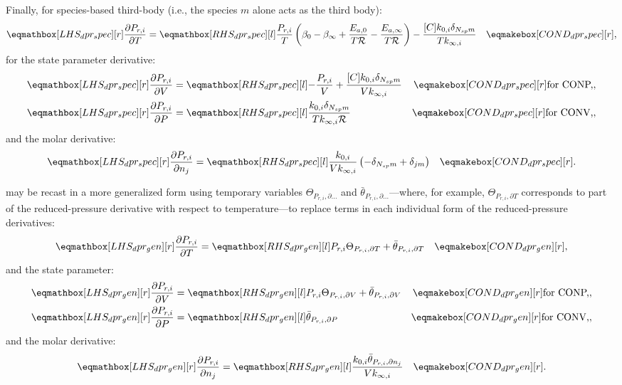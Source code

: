 \documentclass[12pt,number,sort&compress]{elsarticle}
\begin{document}
Finally, for species-based third-body (i.e., the species $m$ alone acts as the third body):
\begin{align}
 \lhs{dpr_spec}{\frac{\partial P_{r, i} }{\partial T }} &=\rhs{dpr_spec}{\frac{P_{r, i}}{T} \left(\beta_{0} - \beta_{\infty} + \frac{E_{a, 0}}{T \Ru/} - \frac{E_{a, \infty}}{T \Ru/}\right) - \frac{[C] k_{0, i} \delta_{\ns/ m}}{T k_{\infty, i}}} & \cond{dpr_spec}{,} \label{e:dpr_spec_dt}
\end{align}
for the state parameter derivative:
\begin{subequations}
 \label{e:dpr_spec_de}
 \begin{align}
  \lhs{dpr_spec}{\frac{\partial P_{r, i} }{\partial V }} &= \rhs{dpr_spec}{- \frac{P_{r, i}}{V} + \frac{[C] k_{0, i} \delta_{\ns/ m}}{V k_{\infty, i}}} & \cond{dpr_spec}{\dconp/,}\\
  \lhs{dpr_spec}{\frac{\partial P_{r, i} }{\partial P }} &= \rhs{dpr_spec}{\frac{k_{0, i} \delta_{\ns/ m}}{T k_{\infty, i} \Ru/}} & \cond{dpr_spec}{\dconv/,}
 \end{align}
\end{subequations}
and the molar derivative:
\begin{align}
 \lhs{dpr_spec}{\frac{\partial P_{r, i} }{\partial n_j }} &=\rhs{dpr_spec}{\frac{k_{0, i}}{V k_{\infty, i}} \left(- \delta_{\ns/ m} + \delta_{j m}\right)} & \cond{dpr_spec}{.} \label{e:dpr_spec_dnj}
\end{align}


 may be recast in a more generalized form using temporary variables $\Theta_{P_{r, i}, \partial \ldots}$ and $\bar{\theta}_{P_{r, i}, \partial \ldots}$---where, for example, $\Theta_{P_{r,i}, \partial T}$ corresponds to part of the reduced-pressure derivative with respect to temperature---to replace terms in each individual form of the reduced-pressure derivatives:
\begin{align}
 \lhs{dpr_gen}{\frac{\partial P_{r, i} }{\partial T } } &= \rhs{dpr_gen}{P_{r, i} \Theta_{P_{r,i}, \partial T} + \bar{\theta}_{P_{r, i}, \partial T}} & \cond{dpr_gen}{,} \label{e:dpr_dt}
\end{align}
and the state parameter:
\begin{subequations}
 \label{e:dpr_de}
 \begin{align}
  \lhs{dpr_gen}{\frac{\partial P_{r, i} }{\partial V}} &= \rhs{dpr_gen}{P_{r, i} \Theta_{P_{r,i}, \partial V} + \bar{\theta}_{P_{r, i}, \partial V}} & \cond{dpr_gen}{\dconp/,} \\
  \lhs{dpr_gen}{\frac{\partial P_{r, i} }{\partial P}} &= \rhs{dpr_gen}{\bar{\theta}_{P_{r, i}, \partial P}} & \cond{dpr_gen}{\dconv/,}
 \end{align}
\end{subequations}
and the molar derivative:
\begin{align}
 \lhs{dpr_gen}{\frac{\partial P_{r, i} }{\partial n_j}} &= \rhs{dpr_gen}{\frac{k_{0, i}\bar{\theta}_{P_{r, i}, \partial n_j}}{V k_{\infty, i}}} & \cond{dpr_gen}{.} \label{e:dpr_dnj}
\end{align}
\end{document}
